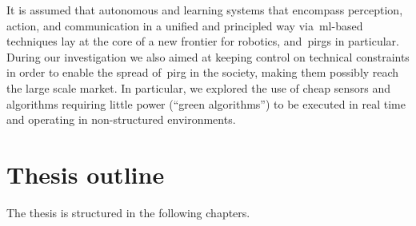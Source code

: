 It is assumed that autonomous and learning systems that encompass perception, action, and communication in a unified and principled way via~\gls{ml}-based techniques lay at the core of a new frontier for robotics, and~\glspl{pirg} in particular. During our investigation we also aimed at keeping control on technical constraints in order to enable the spread of~\gls{pirg} in the society, making them possibly reach the large scale market. In particular, we explored the use of cheap sensors and algorithms requiring little power (``green algorithms'') to be executed in real time and operating in non-structured environments. 

\section{Thesis outline}
The thesis is structured in the following chapters.

